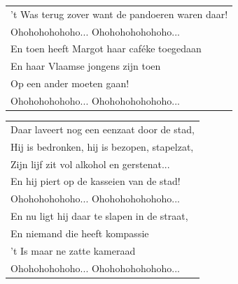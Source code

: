 \documentclass[a4paper, 14pt]{extarticle}
\begin{document}
\begin{flushleft}
\begin{tabularx}{0.8\textwidth} {
   >{\raggedright\arraybackslash}X}
’t Was terug zover want de pandoeren waren daar!\\
Ohohohohohoho... Ohohohohohohoho...\\
En toen heeft Margot haar caféke toegedaan\\
En haar Vlaamse jongens zijn toen\\
Op een ander moeten gaan!\\
Ohohohohohoho... Ohohohohohohoho...\\
\end{tabularx}
\end{flushleft}\begin{flushleft}
\begin{tabularx}{0.8\textwidth} {
   >{\raggedright\arraybackslash}X}
Daar laveert nog een eenzaat door de stad,\\
Hij is bedronken, hij is bezopen, stapelzat,\\
Zijn lijf zit vol alkohol en gerstenat...\\
En hij piert op de kasseien van de stad!\\
Ohohohohohoho... Ohohohohohohoho...\\
En nu ligt hij daar te slapen in de straat,\\
En niemand die heeft kompassie\\
’t Is maar ne zatte kameraad\\
Ohohohohohoho... Ohohohohohohoho...\\
\end{tabularx}
\end{flushleft}
\end{document}
